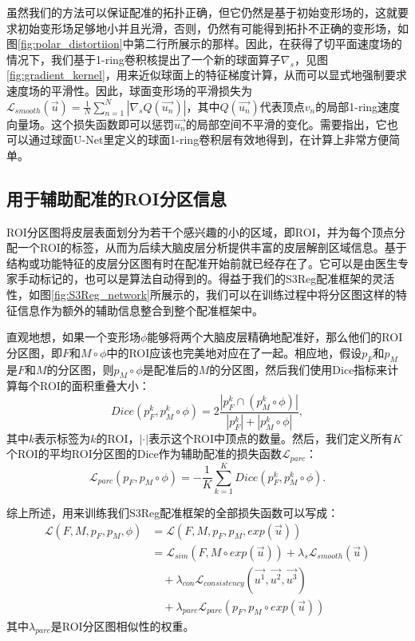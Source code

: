 虽然我们的方法可以保证配准的拓扑正确，但它仍然是基于初始变形场的，这就要求初始变形场足够地小并且光滑\cite{yeo2009spherical}，否则，仍然有可能得到拓扑不正确的变形场，如图\ref{fig:polar_distortiion}中第二行所展示的那样。因此，在获得了切平面速度场的情况下，我们基于1-ring卷积核提出了一个新的球面算子$\nabla_s$，见图\ref{fig:gradient_kernel}，用来近似球面上的特征梯度计算，从而可以显式地强制要求速度场的平滑性。因此，球面变形场的平滑损失为${\mathcal{L}}_{smooth}(\overrightarrow{u})=\frac{1}{N} \sum_{n=1}^{N} |\nabla_s Q(\overrightarrow{u_n}) | $，其中$Q(\overrightarrow{u_n})$代表顶点$v_n$的局部1-ring速度向量场。这个损失函数即可以惩罚$\overrightarrow{u_n}$的局部空间不平滑的变化。需要指出，它也可以通过球面U-Net里定义的球面1-ring卷积层有效地得到，在计算上非常方便简单。

\subsection{用于辅助配准的ROI分区信息}
ROI分区图将皮层表面划分为若干个感兴趣的小的区域，即ROI，并为每个顶点分配一个ROI的标签，从而为后续大脑皮层分析提供丰富的皮层解剖区域信息。基于结构或功能特征的皮层分区图有时在配准开始前就已经存在了。它可以是由医生专家手动标记的，也可以是算法自动得到的\cite{zhao2019spherical_isbi}。得益于我们的S3Reg配准框架的灵活性，如图\ref{fig:S3Reg_network}所展示的，我们可以在训练过程中将分区图这样的特征信息作为额外的辅助信息整合到整个配准框架中。

直观地想，如果一个变形场$\phi$能够将两个大脑皮层精确地配准好，那么他们的ROI分区图，即$F$和$M\circ \phi$中的ROI应该也完美地对应在了一起。相应地，假设$p_F$和$p_M$是$F$和$M$的分区图，则$p_M\circ \phi$是配准后的$M$的分区图，然后我们使用Dice指标来计算每个ROI的面积重叠大小：
\begin{equation}\label{eq:Dice}
Dice(p_F^k, p_M^k \circ \phi) = 2 \frac{| p_F^k \cap (p_M^k \circ \phi)|}{|p_F^k| + |p_M^k \circ \phi|},
\end{equation}
其中$k$表示标签为$k$的ROI，$|\cdot|$表示这个ROI中顶点的数量。然后，我们定义所有$K$个ROI的平均ROI分区图的Dice作为辅助配准的损失函数${\mathcal{L}}_{parc}$：
\begin{equation}
{\mathcal{L}}_{parc}(p_F,p_M \circ \phi) = -\frac{1}{K} \sum_{k=1}^{K} Dice(p_F^k, p_M^k \circ \phi).
\end{equation}

综上所述，用来训练我们S3Reg配准框架的全部损失函数可以写成：
\begin{equation}
	\begin{split}
	{\mathcal{L}}(F,M,p_F, p_M,\phi) & = {\mathcal{L}}(F,M,p_F,p_M,exp(\overrightarrow{u})) \\
	& = {\mathcal{L}}_{sim}(F,M\circ exp(\overrightarrow{u})) + \lambda_s {\mathcal{L}}_{smooth}(\overrightarrow{u}) \\
	& \quad + \lambda_{con} {\mathcal{L}}_{consistency}(\overrightarrow{u^1}, \overrightarrow{u^2}, \overrightarrow{u^3}) \\
	& \quad + \lambda_{parc} {\mathcal{L}}_{parc}(p_F,p_M \circ exp(\overrightarrow{u})) 
	\end{split}
\end{equation}
其中$\lambda_{parc}$是ROI分区图相似性的权重。



